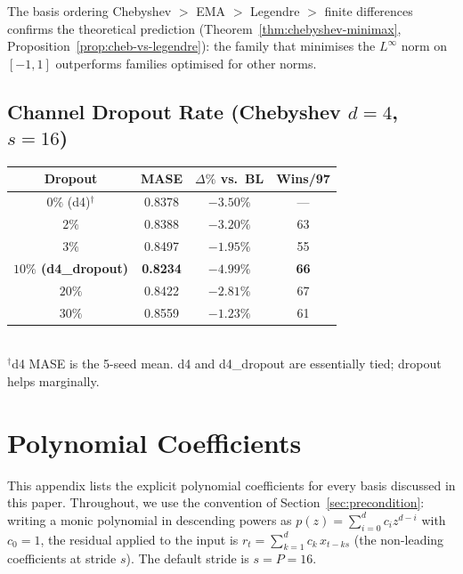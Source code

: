 \documentclass[11pt]{article}
\theoremstyle{plain}
\theoremstyle{definition}
\theoremstyle{remark}
\newcommand{\HD}{\textsf{d4\_dropout}}
\newcommand{\Dnodrop}{\textsf{d4}}
\begin{document}
The basis ordering Chebyshev $>$ EMA $>$ Legendre $>$ finite differences confirms the theoretical prediction (Theorem~\ref{thm:chebyshev-minimax}, Proposition~\ref{prop:cheb-vs-legendre}): the family that minimises the $L^\infty$ norm on $[-1,1]$ outperforms families optimised for other norms.

\subsection{Channel Dropout Rate (Chebyshev $d=4$, $s=16$)}

\begin{table}[h]
\centering
\small
\begin{tabular}{cccc}
\toprule
\textbf{Dropout} & \textbf{MASE} & \textbf{$\Delta\%$ vs.\ BL} & \textbf{Wins/97} \\
\midrule
$0\%$ (\Dnodrop)$^\dagger$ & 0.8378 & $-3.50\%$ & --- \\
$2\%$ & 0.8388 & $-3.20\%$ & 63 \\
$3\%$ & 0.8497 & $-1.95\%$ & 55 \\
\textbf{$10\%$ (\HD{})} & \textbf{0.8234} & $\mathbf{-4.99\%}$ & \textbf{66} \\
$20\%$ & 0.8422 & $-2.81\%$ & 67 \\
$30\%$ & 0.8559 & $-1.23\%$ & 61 \\
\bottomrule
\end{tabular}\\[2pt]
{\footnotesize $^\dagger$\Dnodrop{} MASE is the 5-seed mean. \Dnodrop{} and \HD{} are essentially tied; dropout helps marginally.}
\end{table}

\section{Polynomial Coefficients}
\label{app:poly-coeffs}

This appendix lists the explicit polynomial coefficients for every basis discussed in this paper. Throughout, we use the convention of Section~\ref{sec:precondition}: writing a monic polynomial in descending powers as $p(z) = \sum_{i=0}^{d} c_i z^{d-i}$ with $c_0 = 1$, the residual applied to the input is $r_t = \sum_{k=1}^{d} c_k\, x_{t-ks}$ (the non-leading coefficients at stride $s$). The default stride is $s = P = 16$.
\end{document}
